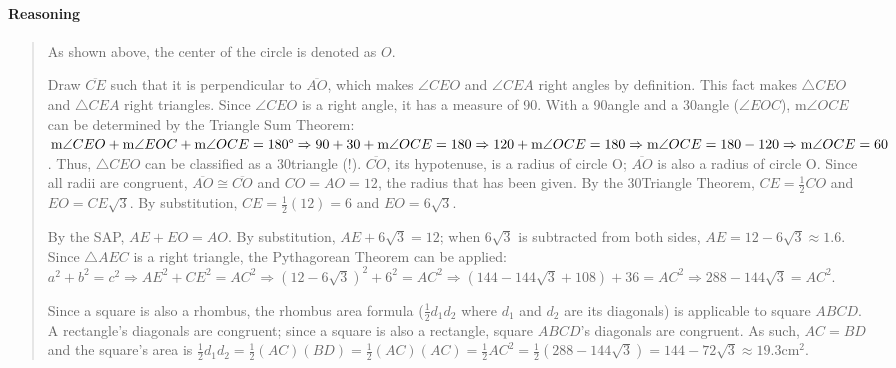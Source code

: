 \documentclass[letterpaper,12pt,twoside]{report}
\begin{document}
	\paragraph{Reasoning}
	\begin{quotation}
		
		As shown above, the center of the circle is denoted as $O$.
		
		Draw $\overline{CE}$ such that it is perpendicular to $\overline{AO}$, which makes $\angle CEO$ and $\angle CEA$ right angles by definition. This fact makes $\triangle CEO$ and $\triangle CEA$ right triangles. Since $\angle CEO$ is a right angle, it has a measure of 90\textdegree. With a 90\textdegree   \space angle and a 30\textdegree \space angle ($\angle EOC$), m$\angle OCE$ can be determined by the Triangle Sum Theorem: $\text{m}\angle CEO+\text{m}\angle EOC+\text{m}\angle OCE=180\text{\textdegree} \Rightarrow 90+30+\text{m}\angle OCE=180 \Rightarrow 120+\text{m}\angle OCE=180 \Rightarrow \text{m}\angle OCE=180-120 \Rightarrow \text{m}\angle OCE=60$\textdegree. Thus, $\triangle CEO$ can be classified as a 30\textdegree \space triangle (!). $\overline{CO}$, its hypotenuse, is a radius of circle O; $\overline{AO}$ is also a radius of circle O. Since all radii are congruent, $\overline{AO}\cong\overline{CO}$ and $CO=AO=12$, the radius that has been given. By the 30\textdegree \space Triangle Theorem, $CE=\frac{1}{2}CO$ and $EO=CE\sqrt{3}$. By substitution, $CE=\frac{1}{2}(12)=6$ and $EO=6\sqrt{3}$.
		
		By the SAP, $AE+EO=AO$. By substitution, $AE+6\sqrt{3}=12$; when $6\sqrt{3}$ is subtracted from both sides, $AE=12-6\sqrt{3}\approx 1.6$. Since $\triangle AEC$ is a right triangle, the Pythagorean Theorem can be applied: $a^2+b^2=c^2 \Rightarrow AE^2+CE^2=AC^2 \Rightarrow (12-6\sqrt{3})^2+6^2=AC^2 \Rightarrow (144-144\sqrt{3}+108)+36=AC^2 \Rightarrow 288-144\sqrt{3}=AC^2$.
		
		Since a square is also a rhombus, the rhombus area formula ($\frac{1}{2}d_1 d_2$ where $d_1$ and $d_2$ are its diagonals) is applicable to square $ABCD$. A rectangle's diagonals are congruent; since a square is also a rectangle, square $ABCD$'s diagonals are congruent. As such, $AC=BD$ and the square's area is $\frac{1}{2}d_1 d_2=\frac{1}{2}(AC)(BD)=\frac{1}{2}(AC)(AC)=\frac{1}{2}AC^2=\frac{1}{2}(288-144\sqrt{3})=\boxed{144-72\sqrt{3}\approx 19.3 \text{cm}^2}$.
			
\end{quotation}
	
	
\end{document}
